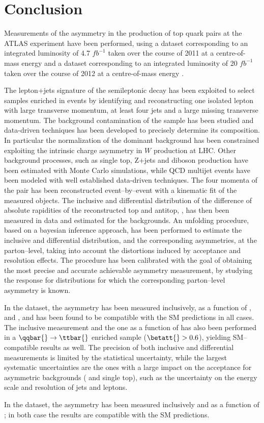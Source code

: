 \chapter{Conclusion}
\label{sec:conclusion}

Measurements of the asymmetry in the production of top quark pairs at
the ATLAS experiment have been performed, using a dataset
corresponding to an integrated luminosity of 4.7 $fb^{−1}$ taken over
the course of 2011 at a centre-of-mass energy \seventev{} and a
dataset corresponding to an integrated luminosity of 20 $fb^{−1}$
taken over the course of 2012 at a centre-of-mass energy \eighttev{}.

The lepton+jets signature of the semileptonic \ttbar{} decay has been
exploited to select samples enriched in \ttbar{} events by identifying
and reconstructing one isolated lepton with large transverse momentum,
at least four jets and a large missing transverse momentum.
The background contamination of the sample has been studied and
data-driven techniques has been developed to precisely determine its
composition. In particular the normalization of the dominant \wjets{}
background has been constrained exploiting the intrinsic charge
asymmetry in $W$ production at LHC. Other background processes, such
as single top, Z+jets and diboson production have been estimated with
Monte Carlo simulations, while QCD multijet events have been modeled
with well established data-driven techniques.
The four momenta of the \ttbar{} pair has been reconstructed
event--by--event with a kinematic fit of the measured objects. The
inclusive and differential distribution of the difference of absolute
rapidities of the reconstructed top and antitop, \dy{}, has then been
measured in data and estimated for the backgrounds.
An unfolding procedure, based on a bayesian inference approach, has
been performed to estimate the inclusive and differential \dy{}
distribution, and the corresponding asymmetries, at the parton--level,
taking into account the distortions induced by acceptance and
resolution effects.
The procedure has been calibrated with the goal of obtaining the most
precise and accurate achievable asymmetry measurement, by studying the
response for distributions for which the corresponding parton--level
asymmetry is known.

In the \seventev{} dataset, the asymmetry \ac{} has been measured
inclusively, as a function of \mtt{}, \pttt{} and \ytt{}, and has been found
to be compatible with the SM predictions in all cases. The inclusive
measurement and the one as a function of \mtt{} has also been performed in
a $\qqbar{}\to\ttbar{}$ enriched sample ($\betatt{}>0.6$), yielding
SM--compatible results as well. The precision of both inclusive and
differential measurements is limited by the statistical uncertainty,
while the largest systematic uncertainties are the ones with a large
impact on the acceptance for asymmetric backgrounds (\wjets{} and
single top), such as the uncertainty on the energy scale and
resolution of jets and leptons.

In the \eighttev{} dataset, the asymmetry \ac{} has been measured
inclusively and as a function of \mtt{}; in both case the results are
compatible with the SM predictions.


